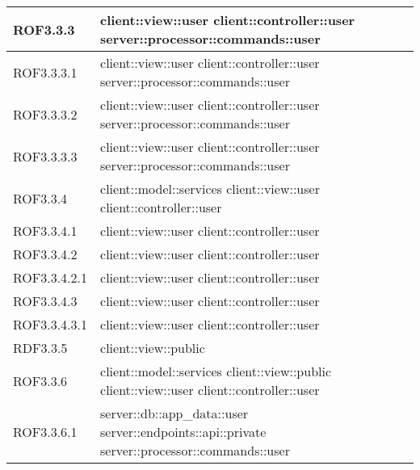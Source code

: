 \begin{center}
\begin{longtable}{| p{4cm} | p{8cm} |}
\hline
ROF3.3.3 & client::view::user \newline client::controller::user \newline server::processor::commands::user \\
\hline
ROF3.3.3.1 & client::view::user \newline client::controller::user \newline server::processor::commands::user \\
\hline
ROF3.3.3.2 & client::view::user \newline client::controller::user \newline server::processor::commands::user \\
\hline
ROF3.3.3.3 & client::view::user \newline client::controller::user \newline server::processor::commands::user \\
\hline
ROF3.3.4 & client::model::services \newline client::view::user \newline client::controller::user \\
\hline
ROF3.3.4.1 & client::view::user \newline client::controller::user \\
\hline
ROF3.3.4.2 & client::view::user \newline client::controller::user \\
\hline
ROF3.3.4.2.1 & client::view::user \newline client::controller::user \\
\hline
ROF3.3.4.3 & client::view::user \newline client::controller::user \\
\hline
ROF3.3.4.3.1 & client::view::user \newline client::controller::user \\
\hline
RDF3.3.5 & client::view::public \\
\hline
ROF3.3.6 & client::model::services \newline client::view::public \newline client::view::user \newline client::controller::user \\
\hline
ROF3.3.6.1 & server::db::app\_data::user \newline server::endpoints::api::private \newline server::processor::commands::user \\
\hline

\end{longtable}
\end{center}
